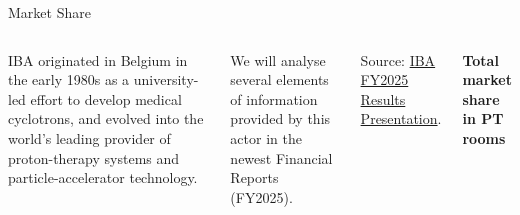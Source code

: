 \documentclass[aspectratio=169,11pt]{beamer}
\begin{document}
\begin{frame}{Market Share}

\vspace{0.1cm}

\begin{columns}[T,onlytextwidth]



{\small
IBA originated in Belgium in the early 1980s as a university-led effort to develop medical cyclotrons, and evolved into the world's leading provider of proton-therapy systems and particle-accelerator technology.
}

\vspace{0.50cm}

\small{
We will analyse several elements of information provided by this actor in the newest Financial Reports (FY2025).}
\vspace{0.50cm}

{\scriptsize
Source:
\href{https://www.iba-worldwide.com/sites/default/files/2026-03/iba-fy25-results-presentation-en.pdf}
{IBA FY2025 Results Presentation}.
}


\centering

{\large\bfseries Total market share in PT rooms}

\vspace{0.18cm}

\end{columns}
\end{frame}
\end{document}
